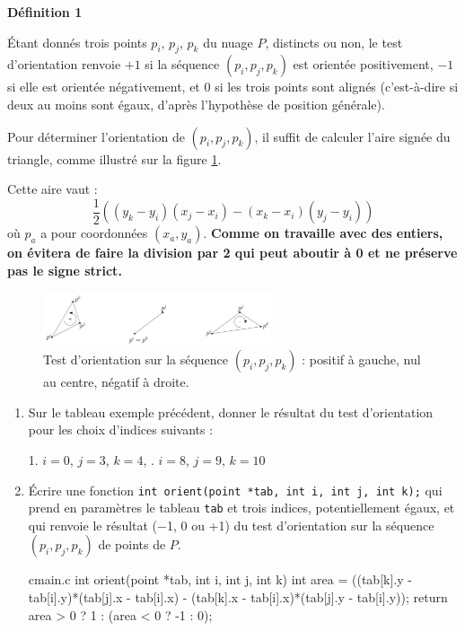 \documentclass[a4paper,french,bookmarks]{article}
\begin{document}
\textbf{Définition 1} \begin{itshape}
Étant donnés trois points $p_i$, $p_j$, $p_k$ du nuage $P$, distincts ou non, le test d’orientation renvoie $+1$ si la séquence $(p_i, p_j , p_k)$ est orientée positivement, $−1$ si elle est orientée négativement, et $0$ si les trois points sont alignés (c’est-à-dire si deux au moins sont égaux, d’après l’hypothèse de position générale).
\end{itshape}

Pour déterminer l’orientation de $(p_i, p_j , p_k)$, il suffit de calculer l’aire signée du triangle, comme illustré sur la figure \ref{fig:fig2}.

Cette aire vaut :
\[ \dfrac{1}{2}\left((y_k-y_i)(x_j-x_i) - (x_k-x_i)(y_j-y_i)\right)\]
où $p_a$ a pour coordonnées $(x_a, y_a)$. \textbf{Comme on travaille avec des entiers, on évitera de faire la division par 2 qui peut aboutir à 0 et ne préserve pas le signe strict.}

\begin{figure}[!ht]
    \centering
    \includegraphics[width=0.6\textwidth]{dm1/figure2.jpg}
    \caption{Test d’orientation sur la séquence $(p_i, p_j , p_k)$ : positif à gauche, nul au centre, négatif à droite.}
    \label{fig:fig2}
\end{figure}

\begin{enumerate}[resume]
    \item Sur le tableau exemple précédent, donner le résultat du test d’orientation pour les choix d’indices suivants :
    
    1. $i = 0$, $j = 3$, $k = 4$, \qquad{}. $i = 8$, $j = 9$, $k = 10$
    
    
    \item Écrire une fonction \verb|int orient(point *tab, int i, int j, int k);| qui prend en paramètres le tableau \verb|tab| et trois indices, potentiellement égaux, et qui renvoie le résultat (−1, 0 ou +1) du test d’orientation sur la séquence $(p_i, p_j , p_k)$ de points de $P$.
    
    \begin{code}{c}{main.c}
int orient(point *tab, int i, int j, int k) {
    int area = ((tab[k].y - tab[i].y)*(tab[j].x - tab[i].x) - 
            (tab[k].x - tab[i].x)*(tab[j].y - tab[i].y));
    return area > 0 ? 1 : (area < 0 ? -1 : 0);
}
    \end{code}
\end{enumerate}
\end{document}
